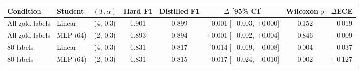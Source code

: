\begin{tabular}{llcccccc}
\toprule
Condition & Student & $(T,\alpha)$ & Hard F1 & Distilled F1 & $\Delta$ [95\% CI] & Wilcoxon $p$ & $\Delta$ECE \\
\midrule
All gold labels & Linear & (4, 0.3) & 0.901 & 0.899 & $-$0.001 [$-$0.003, +0.000] & 0.152 & $-$0.019 \\
All gold labels & MLP (64) & (2, 0.3) & 0.893 & 0.894 & +0.001 [$-$0.002, +0.004] & 0.846 & $-$0.009 \\
80 labels & Linear & (4, 0.3) & 0.831 & 0.817 & $-$0.014 [$-$0.019, $-$0.008] & 0.004 & $-$0.037 \\
80 labels & MLP (64) & (2, 0.3) & 0.831 & 0.815 & $-$0.017 [$-$0.024, $-$0.010] & 0.002 & +0.127 \\
\bottomrule
\end{tabular}

